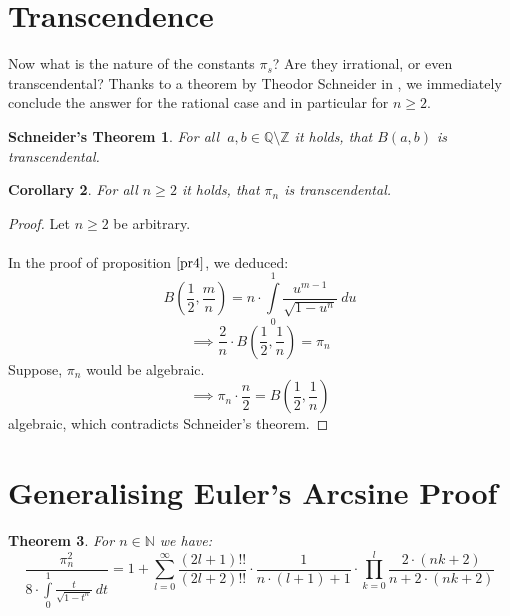 \documentclass[sn-mathphys]{sn-jnl}%
\theoremstyle{thmstyleone}%
\newtheorem{theorem}{Theorem}%
\newtheorem{corollary}[theorem]{Corollary}
\newtheorem{schneider}[theorem]{Schneider's Theorem}
\theoremstyle{thmstyletwo}%
\theoremstyle{thmstylethree}%
\begin{document}
\section{Transcendence}
Now what is the nature of the constants $\pi_s$? Are they irrational, or even transcendental?
Thanks to a theorem by Theodor Schneider in \cite{schneider}, we immediately conclude the answer for the rational case and in particular for $n \geq 2$.
\begin{schneider}\label{th17}
For all $\ a, b \in \mathbb{Q} \setminus \mathbb{Z}$ it holds, that $B(a,b)$ is transcendental.
\end{schneider}
\begin{corollary}\label{co18}
For all $n \geq 2$ it holds, that $\pi_n$ is transcendental.
\end{corollary}
\begin{proof}
Let $n \geq 2$ be arbitrary. \\ \\
In the proof of proposition $\ref{pr4}$, we deduced: 
\begin{equation*}
B(\frac{1}{2}, \frac{m}{n}) = n \cdot \int \limits_{0}^{1} \frac{u^{m-1}}{\sqrt{1 - u^{n}}} \ du
\end{equation*}
\begin{equation*}
\implies \frac{2}{n} \cdot B(\frac{1}{2}, \frac{1}{n}) = \pi_n
\end{equation*}
Suppose, $\pi_n$ would be algebraic.
\begin{equation*}
\implies \pi_n \cdot \frac{n}{2} = B(\frac{1}{2}, \frac{1}{n})
\end{equation*}
algebraic, which contradicts Schneider's theorem.
\end{proof}

\section{Generalising Euler's Arcsine Proof}
\begin{theorem}
For $n \in \mathbb{N}$ we have: \\
\begin{equation}
\frac{\pi_{n}^{2}}{8 \cdot \int \limits_{0}^{1} \frac{t}{\sqrt{1 - t^n}} \ dt} = 1 + \sum \limits_{l=0}^{\infty} \frac{(2l+1)!!}{(2l+2)!!} \cdot \frac{1}{n \cdot (l+1) + 1} \cdot \prod \limits_{k=0}^{l} \frac{2 \cdot (nk+2)}{n + 2 \cdot (nk+2)}
\end{equation}
\end{theorem}
\end{document}
